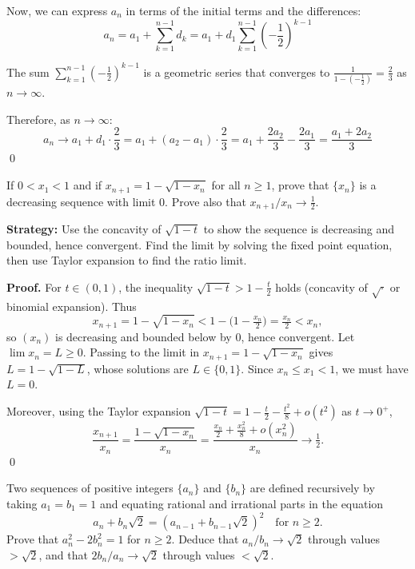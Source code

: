 Now, we can express $a_n$ in terms of the initial terms and the differences:
\[
a_n = a_1 + \sum_{k=1}^{n-1} d_k = a_1 + d_1 \sum_{k=1}^{n-1} \left(-\frac{1}{2}\right)^{k-1}
\]

The sum $\sum_{k=1}^{n-1} \left(-\frac{1}{2}\right)^{k-1}$ is a geometric series that converges to $\frac{1}{1 - \left(-\frac{1}{2}\right)} = \frac{2}{3}$ as $n \to \infty$.

Therefore, as $n \to \infty$:
\[
a_n \to a_1 + d_1 \cdot \frac{2}{3} = a_1 + (a_2 - a_1) \cdot \frac{2}{3} = a_1 + \frac{2a_2}{3} - \frac{2a_1}{3} = \frac{a_1 + 2a_2}{3}
\]\qed



\begin{problembox}
If $0 < x_1 < 1$ and if $x_{n+1} = 1 - \sqrt{1 - x_n}$ for all $n \geq 1$, prove that $\{x_n\}$ is a decreasing sequence with limit 0. Prove also that $x_{n+1}/x_n \to \frac{1}{2}$.
\end{problembox}

\noindent\textbf{Strategy:} Use the concavity of $\sqrt{1-t}$ to show the sequence is decreasing and bounded, hence convergent. Find the limit by solving the fixed point equation, then use Taylor expansion to find the ratio limit.

\noindent\textbf{Proof.}
For $t\in(0,1)$, the inequality $\sqrt{1-t}>1-\tfrac{t}{2}$ holds (concavity of $\sqrt{\cdot}$ or binomial expansion). Thus
\[
x_{n+1}=1-\sqrt{1-x_n}<1-\Big(1-\tfrac{x_n}{2}\Big)=\tfrac{x_n}{2}<x_n,
\]
so $(x_n)$ is decreasing and bounded below by $0$, hence convergent. Let $\lim x_n=L\ge 0$. Passing to the limit in $x_{n+1}=1-\sqrt{1-x_n}$ gives $L=1-\sqrt{1-L}$, whose solutions are $L\in\{0,1\}$. Since $x_n\le x_1<1$, we must have $L=0$.

Moreover, using the Taylor expansion $\sqrt{1-t}=1-\tfrac{t}{2}-\tfrac{t^2}{8}+o(t^2)$ as $t\to 0^+$,
\[
\frac{x_{n+1}}{x_n}=\frac{1-\sqrt{1-x_n}}{x_n}=\frac{\tfrac{x_n}{2}+\tfrac{x_n^2}{8}+o(x_n^2)}{x_n}\to \tfrac12.
\]\qed
\medskip



\begin{problembox}
Two sequences of positive integers $\{a_n\}$ and $\{b_n\}$ are defined recursively by taking $a_1 = b_1 = 1$ and equating rational and irrational parts in the equation
\[a_n + b_n \sqrt{2} = (a_{n-1} + b_{n-1} \sqrt{2})^2 \quad \text{for } n \geq 2.\]
Prove that $a_n^2 - 2b_n^2 = 1$ for $n \geq 2$. Deduce that $a_n/b_n \to \sqrt{2}$ through values $> \sqrt{2}$, and that $2b_n/a_n \to \sqrt{2}$ through values $< \sqrt{2}$.
\end{problembox}

